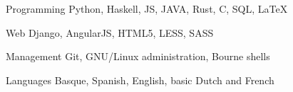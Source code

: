 

\begin{cvskills}

  \cvskill
    {Programming} %
    {Python, Haskell, JS, JAVA, Rust, C, SQL, LaTeX} %

  \cvskill
    {Web} %
    {Django, AngularJS, HTML5, LESS, SASS} %

  \cvskill
    {Management} %
    {Git, GNU/Linux administration, Bourne shells} %

  \cvskill
    {Languages} %
    {Basque, Spanish, English, basic Dutch and French} %

\end{cvskills}
